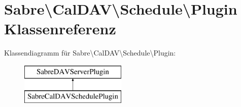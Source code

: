 \hypertarget{class_sabre_1_1_cal_d_a_v_1_1_schedule_1_1_plugin}{}\section{Sabre\textbackslash{}Cal\+D\+AV\textbackslash{}Schedule\textbackslash{}Plugin Klassenreferenz}
\label{class_sabre_1_1_cal_d_a_v_1_1_schedule_1_1_plugin}
Klassendiagramm für Sabre\textbackslash{}Cal\+D\+AV\textbackslash{}Schedule\textbackslash{}Plugin\+:\begin{figure}[H]
\begin{center}
\leavevmode
\includegraphics[height=2.000000cm]{class_sabre_1_1_cal_d_a_v_1_1_schedule_1_1_plugin}
\end{center}
\end{figure}
